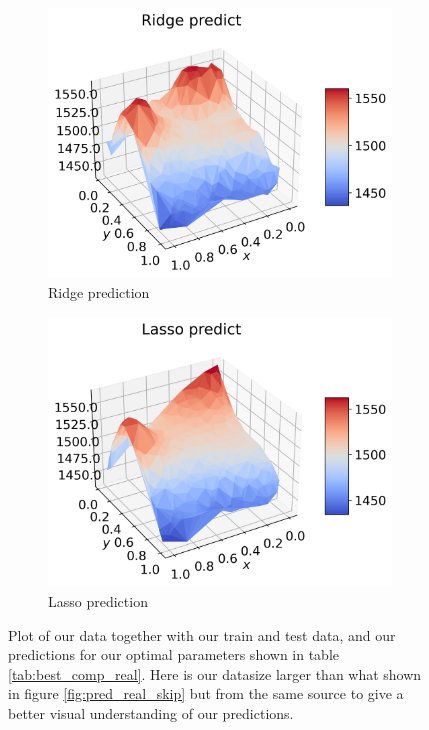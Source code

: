 \documentclass[12pt]{article}
\begin{document}
\begin{figure}[H]
\begin{subfigure}{.5\textwidth}
    \centering
    \includegraphics[width=\textwidth]{../figures/ridge_pred_n40.png}
    \caption{Ridge prediction}
    \label{fig:real_pred_ridge}
  \end{subfigure}
  \begin{subfigure}{.5\textwidth}
    \centering
    \includegraphics[width=\textwidth]{../figures/lasso_pred_n40.png}
    \caption{Lasso prediction}
    \label{fig:real_pred_lasso}
  \end{subfigure}
  \caption{Plot of our data together with our train and test data, and our predictions for our optimal parameters shown in table \ref{tab:best_comp_real}. Here is our datasize larger than what shown in figure \ref{fig:pred_real_skip} but from the same source to give a better visual understanding of our predictions.}
  \label{fig:pred_real}
\end{figure}
\end{document}

